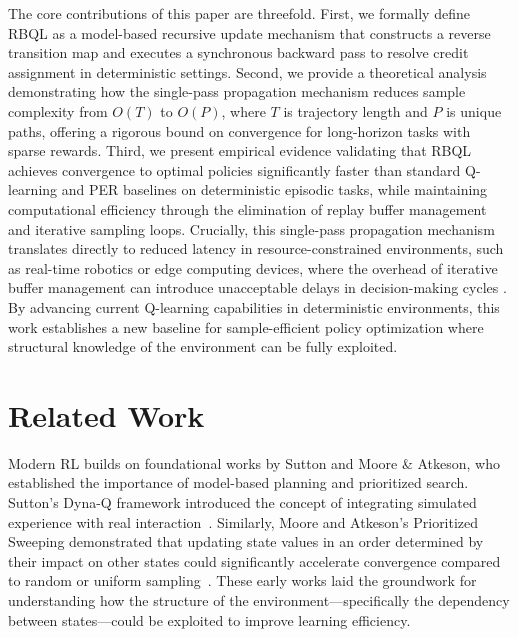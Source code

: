 \documentclass[manuscript, screen, review]{jair}
\begin{document}
The core contributions of this paper are threefold. First, we formally define RBQL as a model-based recursive update mechanism that constructs a reverse transition map and executes a synchronous backward pass to resolve credit assignment in deterministic settings. Second, we provide a theoretical analysis demonstrating how the single-pass propagation mechanism reduces sample complexity from $O(T)$ to $O(P)$, where $T$ is trajectory length and $P$ is unique paths, offering a rigorous bound on convergence for long-horizon tasks with sparse rewards. Third, we present empirical evidence validating that RBQL achieves convergence to optimal policies significantly faster than standard Q-learning and PER baselines on deterministic episodic tasks, while maintaining computational efficiency through the elimination of replay buffer management and iterative sampling loops. Crucially, this single-pass propagation mechanism translates directly to reduced latency in resource-constrained environments, such as real-time robotics or edge computing devices, where the overhead of iterative buffer management can introduce unacceptable delays in decision-making cycles \cite{Lee2018SampleEfficientDR}. By advancing current Q-learning capabilities in deterministic environments, this work establishes a new baseline for sample-efficient policy optimization where structural knowledge of the environment can be fully exploited.

\section{Related Work}
Modern RL builds on foundational works by Sutton and Moore \& Atkeson, who established the importance of model-based planning and prioritized search. Sutton's Dyna-Q framework introduced the concept of integrating simulated experience with real interaction~\cite{Sutton1990DynaQ}. Similarly, Moore and Atkeson's Prioritized Sweeping demonstrated that updating state values in an order determined by their impact on other states could significantly accelerate convergence compared to random or uniform sampling~\cite{MooreAtkeson1993PrioritizedSweeping}. These early works laid the groundwork for understanding how the structure of the environment---specifically the dependency between states---could be exploited to improve learning efficiency.
\end{document}
